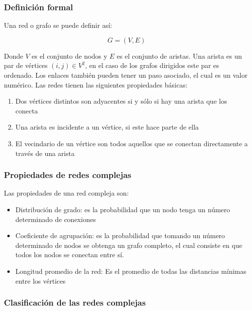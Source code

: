 \subsubsection{Definición formal}

Una red o grafo se puede definir así:

\begin{equation}
    G = (V,E)
\end{equation}

Donde $V$ es el conjunto de nodos y $E$ es el conjunto de aristas. Una arista es un par de vértices $(i,j)\in V^2$, en el caso de los grafos dirigidos este par es ordenado. Los enlaces también pueden tener un paso asociado, el cual es un valor numérico. Las redes tienen las siguientes propiedades básicas:

\begin{enumerate}
    \item Dos vértices distintos son adyacentes si y sólo si hay una arista que los conecta
    \item Una arista es incidente a un vértice, si este hace parte de ella
    \item El vecindario de un vértice son todos aquellos que se conectan directamente a través de una arista
\end{enumerate}

\subsubsection{Propiedades de redes complejas}

Las propiedades de una red compleja son\cite{barabasi2002linked}:

\begin{itemize}
    \item Distribución de grado: es la probabilidad que un nodo tenga un número determinado de conexiones
    \item Coeficiente de agrupación: es la probabilidad que tomando un número determinado de nodos se obtenga un grafo completo, el cual consiste en que todos los nodos se conectan entre sí.
    \item Longitud promedio de la red: Es el promedio de todas las distancias mínimas entre los vértices
\end{itemize}

\subsubsection{Clasificación de las redes complejas}

